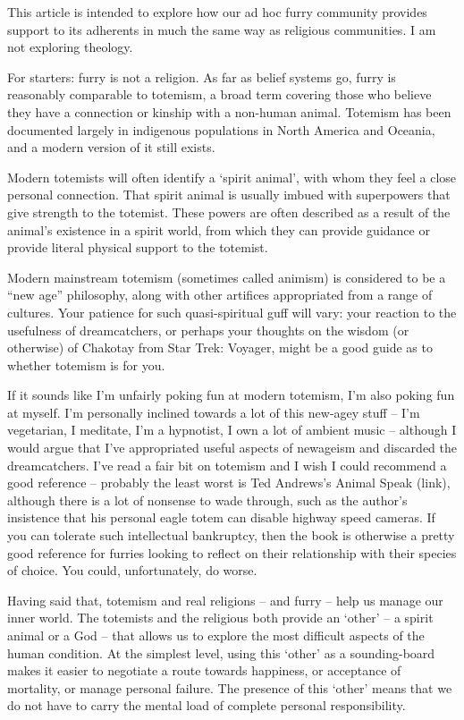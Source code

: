 This article is intended to explore how our ad hoc furry community provides support to its adherents in much the same way as religious communities. I am not exploring theology.

For starters: furry is not a religion. As far as belief systems go, furry is reasonably comparable to totemism, a broad term covering those who believe they have a connection or kinship with a non-human animal. Totemism has been documented largely in indigenous populations in North America and Oceania, and a modern version of it still exists.

Modern totemists will often identify a `spirit animal', with whom they feel a close personal connection. That spirit animal is usually imbued with superpowers that give strength to the totemist. These powers are often described as a result of the animal's existence in a spirit world, from which they can provide guidance or provide literal physical support to the totemist.

Modern mainstream totemism (sometimes called animism) is considered to be a “new age” philosophy, along with other artifices appropriated from a range of cultures. Your patience for such quasi-spiritual guff will vary: your reaction to the usefulness of dreamcatchers, or perhaps your thoughts on the wisdom (or otherwise) of Chakotay from Star Trek: Voyager, might be a good guide as to whether totemism is for you.

If it sounds like I'm unfairly poking fun at modern totemism, I'm also poking fun at myself. I'm personally inclined towards a lot of this new-agey stuff -- I'm vegetarian, I meditate, I'm a hypnotist, I own a lot of ambient music -- although I would argue that I've appropriated useful aspects of newageism and discarded the dreamcatchers. I've read a fair bit on totemism and I wish I could recommend a good reference -- probably the least worst is Ted Andrews's Animal Speak (link), although there is a lot of nonsense to wade through, such as the author's insistence that his personal eagle totem can disable highway speed cameras. If you can tolerate such intellectual bankruptcy, then the book is otherwise a pretty good reference for furries looking to reflect on their relationship with their species of choice. You could, unfortunately, do worse.

Having said that, totemism and real religions -- and furry -- help us manage our inner world. The totemists and the religious both provide an `other' -- a spirit animal or a God -- that allows us to explore the most difficult aspects of the human condition. At the simplest level, using this `other' as a sounding-board makes it easier to negotiate a route towards happiness, or acceptance of mortality, or manage personal failure. The presence of this `other' means that we do not have to carry the mental load of complete personal responsibility.

